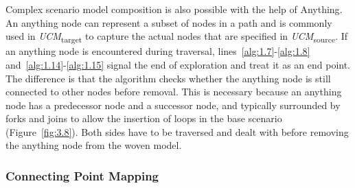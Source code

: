 Complex scenario model composition is also possible with the help of {\cls Anything}. An anything node can represent a subset of nodes in a path and is commonly used in \emph{UCM}\textsubscript{target} to capture the actual nodes that are specified in \emph{UCM}\textsubscript{source}. If an anything node is encountered during traversal, lines~\ref{alg:1.7}-\ref{alg:1.8} and~\ref{alg:1.14}-\ref{alg:1.15} signal the end of exploration and treat it as an end point. The difference is that the algorithm checks whether the anything node is still connected to other nodes before removal. This is necessary because an anything node has a predecessor node and a successor node, and typically surrounded by forks and joins to allow the insertion of loops in the base scenario (Figure~\ref{fig:3.8}). Both sides have to be traversed and dealt with before removing the anything node from the woven model.

\subsubsection{Connecting Point Mapping}

